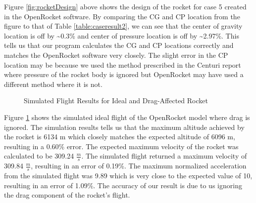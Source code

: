 \documentclass{report}
\begin{document}
\noindent Figure \ref{fig:rocketDesign} above shows the design of the rocket for case 5 created in the OpenRocket software.
By comparing the CG and CP location from the figure to that of Table \ref{table:caseresult2}, we can see that the center of gravity location is off by \textasciitilde0.3\% and center of pressure location is off by \textasciitilde2.97\%.
This tells us that our program calculates the CG and CP locations correctly and matches the OpenRocket software very closely.
The slight error in the CP location may be because we used the method prescribed in the Centuri report where pressure of the rocket body is ignored but OpenRocket may have used a different method where it is not.\\

\begin{figure}[h!]
    \centering
    \caption{Simulated Flight Results for Ideal and Drag-Affected Rocket}
    \label{fig:ideal}
\end{figure}

\noindent Figure \ref{fig:ideal} shows the simulated ideal flight of the OpenRocket model where drag is ignored. 
The simulation results tells us that the maximum altitude achieved by the rocket is 6134 m which closely matches the expected altitude of 6096 m, resulting in a 0.60\% error.
The expected maximum velocity of the rocket was calculated to be 309.24 $\frac{m}{s}$.
The simulated flight returned a maximum velocity of 309.84 $\frac{m}{s}$, resulting in an error of 0.19\%.
The maximum normalized acceleration from the simulated flight was 9.89 which is very close to the expected value of 10, resulting in an error of 1.09\%.
The accuracy of our result is due to us ignoring the drag component of the rocket's flight.\\
\end{document}
